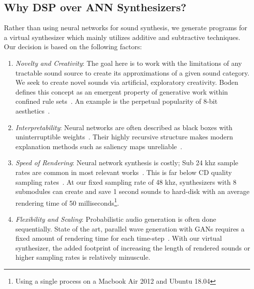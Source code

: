 \documentclass[\main/thesis.tex]{subfiles}
\begin{document}
\subsection{Why DSP over ANN Synthesizers?}
 Rather than using neural networks for sound synthesis, we generate programs for a virtual synthesizer which mainly utilizes additive and subtractive techniques. Our decision is based on the following factors:
\begin{enumerate}[label=(\roman*)]
    \item \textit{Novelty and Creativity}: The goal here is to work with the limitations of any tractable sound source to create its approximations of a given sound category. We seek to create novel sounds via artificial, exploratory creativity. Boden defines this concept as an emergent property of generative work within confined rule sets~\cite{boden2009computer}. An example is the perpetual popularity of 8-bit aesthetics~\cite{collins2007loop}. 
    \item \textit{Interpretability}: Neural networks are often described as black boxes with uninterruptible weights~\cite{basheer2000artificial}. Their highly recursive structure makes modern explanation methods such as saliency maps unreliable~\cite{rudin2019stop}.  
    \item \textit{Speed of Rendering}: Neural network synthesis is costly; Sub 24 khz sample rates are common in most relevant works~\cite{yamamoto2020parallel,oord2017parallel,aouameur2019neural,ramires2020neural}. This is far below CD quality sampling rates~\cite{reiss2016meta}. At our fixed sampling rate of 48 khz, synthesizers with 8 submodules can create and save 1 second sounds to hard-disk with an average rendering time of 50 milliseconds\footnote{Using a single process on a Macbook Air 2012 and Ubuntu 18.04}. 
    \item \textit{Flexibility and Scaling}: Probabilistic audio generation is often done sequentially. State of the art, parallel wave generation with GANs requires a fixed amount of rendering time for each time-step~\cite{yamamoto2020parallel}. With our virtual synthesizer, the added footprint of increasing the length of rendered sounds or higher sampling rates is relatively minuscule.  
\end{enumerate}
\end{document}
